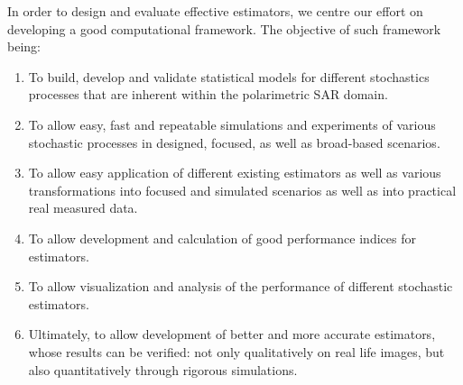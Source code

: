 In order to design and evaluate effective estimators, we centre our effort on developing a good computational framework. 
The objective of such framework being:
\begin{enumerate}
\item To build, develop and validate statistical models for different stochastics processes that are inherent within the polarimetric SAR domain.
\item To allow easy, fast and repeatable simulations and experiments of various stochastic processes in designed, focused, as well as broad-based scenarios.
\item To allow easy application of different existing estimators as well as various transformations into focused and simulated scenarios as well as into practical real measured data.
\item To allow development and calculation of good performance indices for estimators. 
\item To allow visualization and analysis of the performance of different stochastic estimators.
\item Ultimately, to allow development of better and more accurate estimators, whose results can be verified: not only qualitatively on real life images, but also quantitatively through rigorous simulations.
\end{enumerate}

